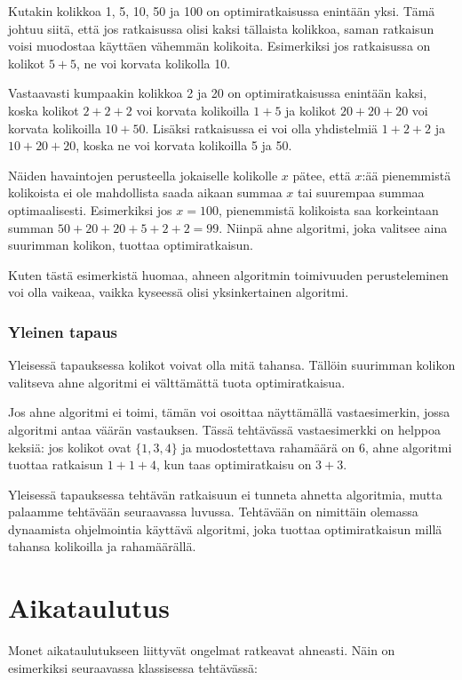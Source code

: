 Kutakin kolikkoa 1, 5, 10, 50 ja 100
on optimiratkaisussa enintään yksi.
Tämä johtuu siitä, että jos
ratkaisussa olisi kaksi tällaista kolikkoa,
saman ratkaisun voisi muodostaa
käyttäen vähemmän kolikoita.
Esimerkiksi jos ratkaisussa on
kolikot $5+5$, ne voi korvata kolikolla 10.

Vastaavasti kumpaakin kolikkoa 2 ja 20
on optimiratkaisussa enintään kaksi,
koska kolikot $2+2+2$ voi korvata kolikoilla $1+5$
ja kolikot $20+20+20$ voi korvata kolikoilla $10+50$.
Lisäksi ratkaisussa ei voi olla yhdistelmiä
$1+2+2$ ja $10+20+20$,
koska ne voi korvata kolikoilla 5 ja 50.

Näiden havaintojen perusteella
jokaiselle kolikolle $x$ pätee,
että $x$:ää pienemmistä kolikoista
ei ole mahdollista saada aikaan summaa
$x$ tai suurempaa summaa optimaalisesti.
Esimerkiksi jos $x=100$, pienemmistä kolikoista
saa korkeintaan summan $50+20+20+5+2+2=99$.
Niinpä ahne algoritmi,
joka valitsee aina suurimman kolikon,
tuottaa optimiratkaisun.

Kuten tästä esimerkistä huomaa,
ahneen algoritmin toimivuuden perusteleminen
voi olla vaikeaa,
vaikka kyseessä olisi yksinkertainen algoritmi.

\subsubsection{Yleinen tapaus}

Yleisessä tapauksessa kolikot voivat olla mitä tahansa.
Tällöin suurimman kolikon valitseva ahne algoritmi
ei välttämättä tuota optimiratkaisua.

Jos ahne algoritmi ei toimi, tämän voi osoittaa
näyttämällä vastaesimerkin, jossa algoritmi
antaa väärän vastauksen.
Tässä tehtävässä vastaesimerkki on helppoa keksiä:
jos kolikot ovat $\{1,3,4\}$ ja muodostettava
rahamäärä on 6, ahne algoritmi tuottaa ratkaisun
$1+1+4$, kun taas optimiratkaisu on $3+3$.

Yleisessä tapauksessa tehtävän ratkaisuun
ei tunneta ahnetta algoritmia,
mutta palaamme tehtävään seuraavassa luvussa.
Tehtävään on nimittäin olemassa dynaamista
ohjelmointia käyttävä algoritmi,
joka tuottaa optimiratkaisun
millä tahansa kolikoilla ja rahamäärällä.

\section{Aikataulutus}

Monet aikataulutukseen liittyvät ongelmat
ratkeavat ahneasti.
Näin on esimerkiksi seuraavassa klassisessa tehtävässä:

